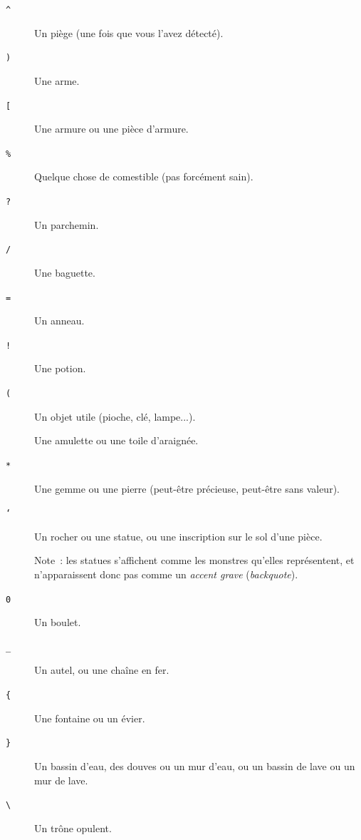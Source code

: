 \documentclass[titlepage]{article}
\begin{document}
\begin{description}
\item[{\texttt{\textasciicircum{}}}]
Un piège (une fois que vous l'avez détecté).

\item[{\texttt{)}}]
Une arme.

\item[{\texttt{[}}]
Une armure ou une pièce d'armure.

\item[{\texttt{\%}}]
Quelque chose de comestible (pas forcément sain).

\item[{\texttt{?}}]
Un parchemin.

\item[{\texttt{/}}]
Une baguette.

\item[{\texttt{=}}]
Un anneau.

\item[{\texttt{!}}]
Une potion.

\item[{\texttt{(}}]
Un objet utile (pioche, clé, lampe...).

\item[{\texttt{\textquotedbl{}}}]
Une amulette ou une toile d'araignée.

\item[{\texttt{*}}]
Une gemme ou une pierre (peut-être précieuse, peut-être sans valeur).

\item[{\texttt{`}}]
Un rocher ou une statue, ou une inscription sur le sol d'une pièce.


Note~: les statues s'affichent comme les monstres qu'elles représentent,
et n'apparaissent donc pas comme un \textit{accent grave} (\textit{backquote}).

\item[{\texttt{0}}]
Un boulet.

\item[{\texttt{\_}}]
Un autel, ou une chaîne en fer.

\item[{\texttt{\{}}]
Une fontaine ou un évier.

\item[{\texttt{\}}}]
Un bassin d'eau, des douves ou un mur d'eau,
ou un bassin de lave ou un mur de lave.

\item[{\texttt{\textbackslash{}}}]
Un trône opulent.


\end{description}
\end{document}
